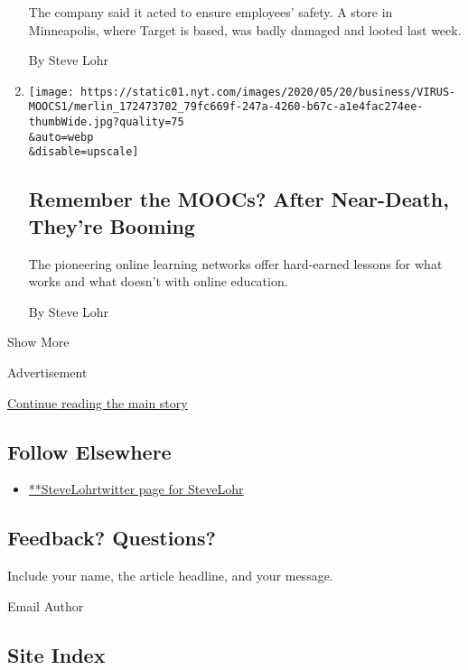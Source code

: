 \begin{enumerate}
  The company said it acted to ensure employees' safety. A store in
  Minneapolis, where Target is based, was badly damaged and looted last
  week.

  By Steve Lohr
\item
  \href{/2020/05/26/technology/moocs-online-learning.html}{}

  \texttt{[image: https://static01.nyt.com/images/2020/05/20/business/VIRUS-MOOCS1/merlin\_172473702\_79fc669f-247a-4260-b67c-a1e4fac274ee-thumbWide.jpg?quality=75\\\&auto=webp\\\&disable=upscale]}

  \hypertarget{remember-the-moocs-after-near-death-theyre-booming}{%
  \subsection{Remember the MOOCs? After Near-Death, They're
  Booming}\label{remember-the-moocs-after-near-death-theyre-booming}}

  The pioneering online learning networks offer hard-earned lessons for
  what works and what doesn't with online education.

  By Steve Lohr
\end{enumerate}

Show More

Advertisement

\protect\hyperlink{after-mid2}{Continue reading the main story}

\hypertarget{follow-elsewhere}{%
\subsection{Follow Elsewhere}\label{follow-elsewhere}}

\begin{itemize}
\tightlist
\item
  \href{https://twitter.com/SteveLohr}{**SteveLohrtwitter page for
  SteveLohr}
\end{itemize}

\hypertarget{feedback-questions}{%
\subsection{Feedback? Questions?}\label{feedback-questions}}

Include your name, the article headline, and your message.

Email Author

\hypertarget{site-index}{%
\subsection{Site Index}\label{site-index}}

